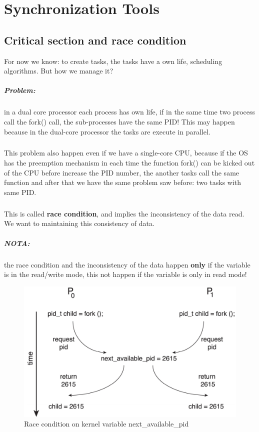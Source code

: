 \chapter{Synchronization Tools}


\section{Critical section and race condition}
For now we know: to create tasks, the tasks have a own life, scheduling algorithms. But how we manage it?

\paragraph{Problem:} in a dual core processor each process has own life, if in the same time two process call the fork() call, the sub-processes have the same PID! This may happen because in the dual-core processor the tasks are execute in parallel. 

\paragraph{}
This problem also happen even if we have a single-core CPU, because if the OS has the preemption mechanism in each time the function fork() can be kicked out of the CPU before increase the PID number, the another tasks call the same function and after that we have the same problem saw before: two tasks with same PID.

\paragraph{}
This is called \textbf{race condition}, and implies the inconsistency of the data read. We want to maintaining this consistency of data.

\paragraph{NOTA:} the race condition and the inconsistency of the data happen \textbf{only} if the variable is in the read/write mode, this not happen if the variable is only in read mode!


\begin{figure}[htbp]
    \centering
    \includegraphics[width=0.65\linewidth]{img/race_cond.png}
    \caption{Race condition on kernel variable next\_available\_pid}    
\end{figure}


